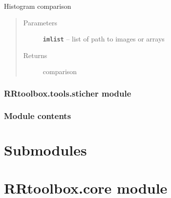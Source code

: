 \documentclass[letterpaper,10pt,english]{sphinxmanual}
\begin{document}

\begin{fulllineitems}
\label{RRtoolbox.tools:RRtoolbox.tools.selectors.hist_comp}
Histogram comparison
\begin{quote}\begin{description}
\item[{Parameters}] \leavevmode
\textbf{\texttt{imlist}} -- list of path to images or arrays

\item[{Returns}] \leavevmode
comparison

\end{description}\end{quote}

\end{fulllineitems}



\subsubsection{RRtoolbox.tools.sticher module}
\label{RRtoolbox.tools:rrtoolbox-tools-sticher-module}\label{RRtoolbox.tools:module-RRtoolbox.tools.sticher}

\begin{fulllineitems}
\label{RRtoolbox.tools:RRtoolbox.tools.sticher.stich}
\end{fulllineitems}



\subsubsection{Module contents}
\label{RRtoolbox.tools:module-contents}\label{RRtoolbox.tools:module-RRtoolbox.tools}

\section{Submodules}
\label{RRtoolbox:submodules}

\section{RRtoolbox.core module}
\label{RRtoolbox:module-RRtoolbox.core}\label{RRtoolbox:rrtoolbox-core-module}
\end{document}

